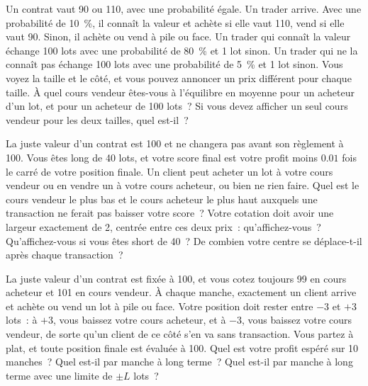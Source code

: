 \begin{question}\label{iq:iv2:making-a-market:15}
Un contrat vaut 90 ou 110, avec une probabilité égale. Un trader arrive. Avec une probabilité de 10~\%, il connaît la valeur et achète si elle vaut 110, vend si elle vaut 90. Sinon, il achète ou vend à pile ou face. Un trader qui connaît la valeur échange 100 lots avec une probabilité de 80~\% et 1 lot sinon. Un trader qui ne la connaît pas échange 100 lots avec une probabilité de 5~\% et 1 lot sinon. Vous voyez la taille et le côté, et vous pouvez annoncer un prix différent pour chaque taille. À quel cours vendeur êtes-vous à l'équilibre en moyenne pour un acheteur d'un lot, et pour un acheteur de 100 lots~? Si vous devez afficher un seul cours vendeur pour les deux tailles, quel est-il~?
\end{question}

\begin{question}\label{iq:iv2:making-a-market:16}
La juste valeur d'un contrat est 100 et ne changera pas avant son règlement à 100. Vous êtes long de 40 lots, et votre score final est votre profit moins $0.01$ fois le carré de votre position finale. Un client peut acheter un lot à votre cours vendeur ou en vendre un à votre cours acheteur, ou bien ne rien faire. Quel est le cours vendeur le plus bas et le cours acheteur le plus haut auxquels une transaction ne ferait pas baisser votre score~? Votre cotation doit avoir une largeur exactement de 2, centrée entre ces deux prix~: qu'affichez-vous~? Qu'affichez-vous si vous êtes short de 40~? De combien votre centre se déplace-t-il après chaque transaction~?
\end{question}

\begin{question}\label{iq:iv2:making-a-market:17}
La juste valeur d'un contrat est fixée à 100, et vous cotez toujours 99 en cours acheteur et 101 en cours vendeur. À chaque manche, exactement un client arrive et achète ou vend un lot à pile ou face. Votre position doit rester entre $-3$ et $+3$ lots~: à $+3$, vous baissez votre cours acheteur, et à $-3$, vous baissez votre cours vendeur, de sorte qu'un client de ce côté s'en va sans transaction. Vous partez à plat, et toute position finale est évaluée à 100. Quel est votre profit espéré sur 10 manches~? Quel est-il par manche à long terme~? Quel est-il par manche à long terme avec une limite de $\pm L$ lots~?
\end{question}

